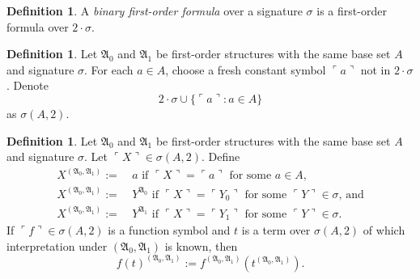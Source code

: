\documentclass[12pt, twoside]{memoir}
\numberwithin{equation}{section}
\theoremstyle{definition}
\newtheorem{defi}[thm]{Definition}
\theoremstyle{remark}
\theoremstyle{definition}
\theoremstyle{definition}
\theoremstyle{definition}
\theoremstyle{remark}
\begin{document}
\begin{defi}
A \emph{binary first-order formula} over a signature $\sigma$ is a first-order formula over $2 \cdot \sigma$.
\end{defi}

\begin{defi}
Let $\mathfrak{A}_0$ and $\mathfrak{A}_1$ be first-order structures with the same base set $A$ and signature $\sigma$. For each $a \in A$, choose a fresh constant symbol $\ulcorner a \urcorner$ not in $2 \cdot \sigma$. Denote
\begin{equation*}
    2 \cdot \sigma \cup \{\ulcorner a \urcorner : a \in A\}
\end{equation*}
as $\sigma(A, 2)$.
\end{defi}

\begin{defi}
Let $\mathfrak{A}_0$ and $\mathfrak{A}_1$ be first-order structures with the same base set $A$ and signature $\sigma$. Let $\ulcorner X \urcorner \in \sigma(A, 2)$.
Define
\begin{align*}
    X^{(\mathfrak{A}_0, \mathfrak{A}_1)} := \ & a \text{ if } \ulcorner X \urcorner = \ulcorner a \urcorner \text{ for some } a \in A \text{,} \\
    X^{(\mathfrak{A}_0, \mathfrak{A}_1)} := \ & Y^{\mathfrak{A}_0} \text{ if } \ulcorner X \urcorner = \ulcorner Y_0 \urcorner \text{ for some } \ulcorner Y \urcorner \in \sigma \text{, and} \\
    X^{(\mathfrak{A}_0, \mathfrak{A}_1)} := \ & Y^{\mathfrak{A}_1} \text{ if } \ulcorner X \urcorner = \ulcorner Y_1 \urcorner \text{ for some } \ulcorner Y \urcorner \in \sigma \text{.}
\end{align*}
If $\ulcorner f \urcorner \in \sigma(A, 2)$ is a function symbol and $t$ is a term over $\sigma(A, 2)$ of which interpretation under $(\mathfrak{A}_0, \mathfrak{A}_1)$ is known, then 
\begin{equation*}
    f(t)^{(\mathfrak{A}_0, \mathfrak{A}_1)} := f^{(\mathfrak{A}_0, \mathfrak{A}_1)}(t^{(\mathfrak{A}_0, \mathfrak{A}_1)}) \text{.}
\end{equation*}
\end{defi}
\end{document}
